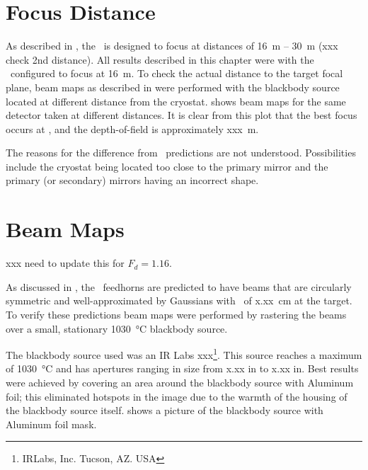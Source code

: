 
\section{Focus Distance}\label{s:focus-distance}

As described in , the \Imager\ is designed to focus at distances of 16~m -- 30~m (xxx check 2nd distance).
All results described in this chapter were with the \Imager\ configured to focus at 16~m.
To check the actual distance to the target focal plane, beam maps as described in  were performed with the blackbody source located at different distance from the cryostat.
 shows beam maps for the same detector taken at different distances.
It is clear from this plot that the best focus occurs at , and the depth-of-field is approximately xxx~m.

The reasons for the difference from \ZEMAX\ predictions are not understood.
Possibilities include the cryostat being located too close to the primary mirror and the primary (or secondary) mirrors having an incorrect shape.

\section{Beam Maps} \label{sec:ch8-beam-maps}

xxx need to update this for $F_d = 1.16$.

As discussed in , the \Imager\ feedhorns are predicted to have beams that are circularly symmetric and well-approximated by Gaussians with \FWHM\ of x.xx~cm at the target.
To verify these predictions beam maps were performed by rastering the beams over a small, stationary \SI{1030}{\celsius} blackbody source.

The blackbody source used was an IR Labs xxx\footnote{IRLabs, Inc. Tucson, AZ. USA}.
This source reaches a maximum of \SI{1030}{\celsius} and has apertures ranging in size from x.xx in to x.xx in.
Best results were achieved by covering an area around the blackbody source with Aluminum foil; this eliminated hotspots in the image due to the warmth of the housing of the blackbody source itself.
 shows a picture of the blackbody source with Aluminum foil mask.

